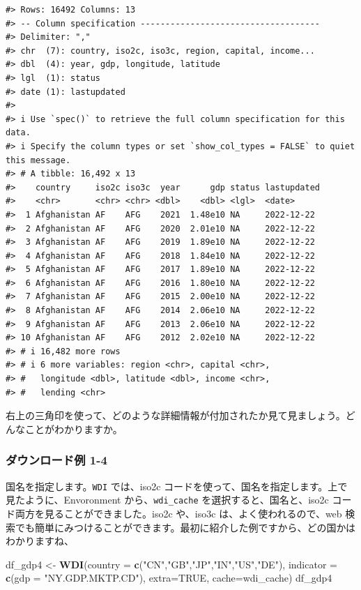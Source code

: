 \documentclass[
  xelatex, ja=standard]{bxjsbook}
\newenvironment{Shaded}{\begin{snugshade}}{\end{snugshade}}
\newcommand{\AttributeTok}[1]{\textcolor[rgb]{0.13,0.29,0.53}{#1}}
\newcommand{\ConstantTok}[1]{\textcolor[rgb]{0.56,0.35,0.01}{#1}}
\newcommand{\FunctionTok}[1]{\textcolor[rgb]{0.13,0.29,0.53}{\textbf{#1}}}
\newcommand{\NormalTok}[1]{#1}
\newcommand{\OtherTok}[1]{\textcolor[rgb]{0.56,0.35,0.01}{#1}}
\newcommand{\StringTok}[1]{\textcolor[rgb]{0.31,0.60,0.02}{#1}}
\theoremstyle{definition}
\theoremstyle{definition}
\theoremstyle{definition}
\theoremstyle{definition}
\theoremstyle{remark}
\begin{document}
\begin{verbatim}
#> Rows: 16492 Columns: 13
#> -- Column specification ------------------------------------
#> Delimiter: ","
#> chr  (7): country, iso2c, iso3c, region, capital, income...
#> dbl  (4): year, gdp, longitude, latitude
#> lgl  (1): status
#> date (1): lastupdated
#> 
#> i Use `spec()` to retrieve the full column specification for this data.
#> i Specify the column types or set `show_col_types = FALSE` to quiet this message.
#> # A tibble: 16,492 x 13
#>    country     iso2c iso3c  year      gdp status lastupdated
#>    <chr>       <chr> <chr> <dbl>    <dbl> <lgl>  <date>     
#>  1 Afghanistan AF    AFG    2021  1.48e10 NA     2022-12-22 
#>  2 Afghanistan AF    AFG    2020  2.01e10 NA     2022-12-22 
#>  3 Afghanistan AF    AFG    2019  1.89e10 NA     2022-12-22 
#>  4 Afghanistan AF    AFG    2018  1.84e10 NA     2022-12-22 
#>  5 Afghanistan AF    AFG    2017  1.89e10 NA     2022-12-22 
#>  6 Afghanistan AF    AFG    2016  1.80e10 NA     2022-12-22 
#>  7 Afghanistan AF    AFG    2015  2.00e10 NA     2022-12-22 
#>  8 Afghanistan AF    AFG    2014  2.06e10 NA     2022-12-22 
#>  9 Afghanistan AF    AFG    2013  2.06e10 NA     2022-12-22 
#> 10 Afghanistan AF    AFG    2012  2.02e10 NA     2022-12-22 
#> # i 16,482 more rows
#> # i 6 more variables: region <chr>, capital <chr>,
#> #   longitude <dbl>, latitude <dbl>, income <chr>,
#> #   lending <chr>
\end{verbatim}

右上の三角印を使って、どのような詳細情報が付加されたか見て見ましょう。どんなことがわかりますか。

\hypertarget{ux30c0ux30a6ux30f3ux30edux30fcux30c9ux4f8b-1-4}{%
\subsubsection{ダウンロード例 1-4}\label{ux30c0ux30a6ux30f3ux30edux30fcux30c9ux4f8b-1-4}}

国名を指定します。\texttt{WDI} では、iso2c コードを使って、国名を指定します。上で見たように、Envoronment から、\texttt{wdi\_cache} を選択すると、国名と、iso2c コード両方を見ることができました。iso2c や、iso3c は、よく使われるので、web 検索でも簡単にみつけることができます。最初に紹介した例ですから、どの国かはわかりますね、

\begin{Shaded}
\begin{Highlighting}[]
\NormalTok{df\_gdp4 }\OtherTok{\textless{}{-}} \FunctionTok{WDI}\NormalTok{(}\AttributeTok{country =} \FunctionTok{c}\NormalTok{(}\StringTok{"CN"}\NormalTok{,}\StringTok{"GB"}\NormalTok{,}\StringTok{"JP"}\NormalTok{,}\StringTok{"IN"}\NormalTok{,}\StringTok{"US"}\NormalTok{,}\StringTok{"DE"}\NormalTok{), }
               \AttributeTok{indicator =} \FunctionTok{c}\NormalTok{(}\AttributeTok{gdp =} \StringTok{"NY.GDP.MKTP.CD"}\NormalTok{), }\AttributeTok{extra=}\ConstantTok{TRUE}\NormalTok{, }\AttributeTok{cache=}\NormalTok{wdi\_cache)}
\NormalTok{df\_gdp4}
\end{Highlighting}
\end{Shaded}
\end{document}
